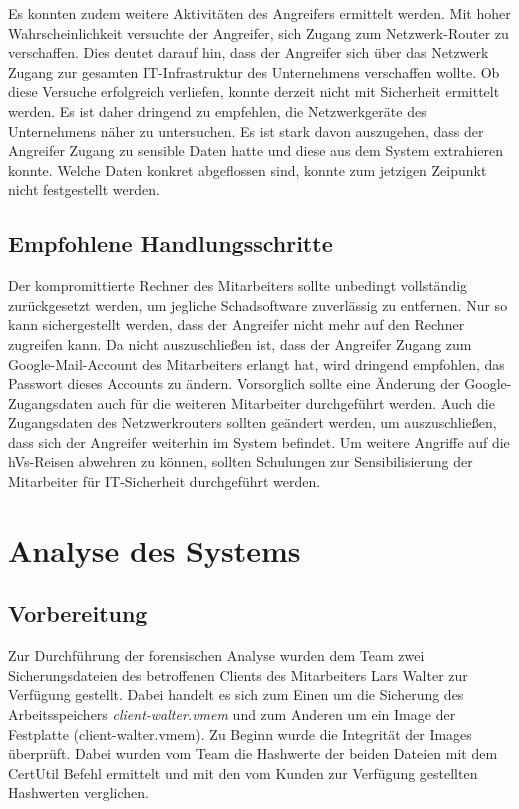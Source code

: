 Es konnten zudem weitere Aktivitäten des Angreifers ermittelt werden.
Mit hoher Wahrscheinlichkeit versuchte der Angreifer, sich Zugang zum Netzwerk-Router zu verschaffen.
Dies deutet darauf hin, dass der Angreifer sich über das Netzwerk Zugang zur gesamten IT-Infrastruktur des Unternehmens verschaffen wollte.
Ob diese Versuche erfolgreich verliefen, konnte derzeit nicht mit Sicherheit ermittelt werden.
Es ist daher dringend zu empfehlen, die Netzwerkgeräte des Unternehmens näher zu untersuchen.
Es ist stark davon auszugehen, dass der Angreifer Zugang zu sensible Daten hatte und diese aus dem System extrahieren konnte.
Welche Daten konkret abgeflossen sind, konnte zum jetzigen Zeipunkt nicht festgestellt werden.

\section{Empfohlene Handlungsschritte}
Der kompromittierte Rechner des Mitarbeiters sollte unbedingt vollständig zurückgesetzt werden, um jegliche Schadsoftware zuverlässig zu entfernen.
Nur so kann sichergestellt werden, dass der Angreifer nicht mehr auf den Rechner zugreifen kann.
Da nicht auszuschließen ist, dass der Angreifer Zugang zum Google-Mail-Account des Mitarbeiters erlangt hat, wird dringend empfohlen, das Passwort dieses Accounts zu ändern.
Vorsorglich sollte eine Änderung der Google-Zugangsdaten auch für die weiteren Mitarbeiter durchgeführt werden.
Auch die Zugangsdaten des Netzwerkrouters sollten geändert werden, um auszuschließen, dass sich der Angreifer weiterhin im System befindet.
Um weitere Angriffe auf die hVs-Reisen abwehren zu können, sollten Schulungen zur Sensibilisierung der Mitarbeiter für IT-Sicherheit durchgeführt werden.

\chapter{Analyse des Systems}

\section{Vorbereitung}
Zur Durchführung der forensischen Analyse wurden dem Team zwei Sicherungsdateien des betroffenen Clients des Mitarbeiters Lars Walter zur Verfügung gestellt. Dabei handelt es sich zum Einen um die Sicherung des Arbeitsspeichers \textit{client-walter.vmem} und zum Anderen um ein Image der Festplatte (client-walter.vmem). 
Zu Beginn wurde die Integrität der Images überprüft. Dabei wurden vom Team die Hashwerte der beiden Dateien mit dem CertUtil Befehl ermittelt und mit den vom Kunden zur Verfügung gestellten Hashwerten verglichen.

